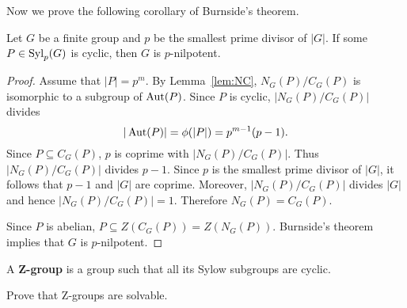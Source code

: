 Now we prove the following corollary of Burnside's theorem. 

\begin{corollary}
	\label{cor:Sylow_ciclico}
	Let $G$ be a finite group and $p$ be the smallest prime divisor of $|G|$. 
	If some $P\in\mathrm{Syl}_p(G)$ is cyclic, then $G$ is $p$-nilpotent.
\end{corollary}

\begin{proof}
	Assume that $|P|=p^m$. By Lemma~\ref{lem:NC}, $N_G(P)/C_G(P)$ is isomorphic to 
	a subgroup of $\operatorname{Aut}(P)$. Since $P$ is cyclic, $|N_G(P)/C_G(P)|$ divides 
	\[
		|\operatorname{Aut}(P)|=\phi(|P|)=p^{m-1}(p-1).
	\]
	Since $P\subseteq C_G(P)$, $p$ is coprime with 
	$|N_G(P)/C_G(P)|$.  Thus $|N_G(P)/C_G(P)|$ divides $p-1$. Since $p$ is the smallest prime divisor
	of $|G|$, it follows that $p-1$ and 
	$|G|$ are coprime. Moreover, 
	$|N_G(P)/C_G(P)|$ divides $|G|$ and hence 
	$|N_G(P)/C_G(P)|=1$. Therefore $N_G(P)=C_G(P)$. 

	Since $P$ is abelian, $P\subseteq Z(C_G(P))=Z(N_G(P))$. Burnside's theorem implies that
	$G$ is $p$-nilpotent. 
\end{proof}

A \textbf{Z-group} is a group such that all its Sylow subgroups are cyclic. 

\begin{exercise}
	Prove that Z-groups are solvable. 
\end{exercise}

%


